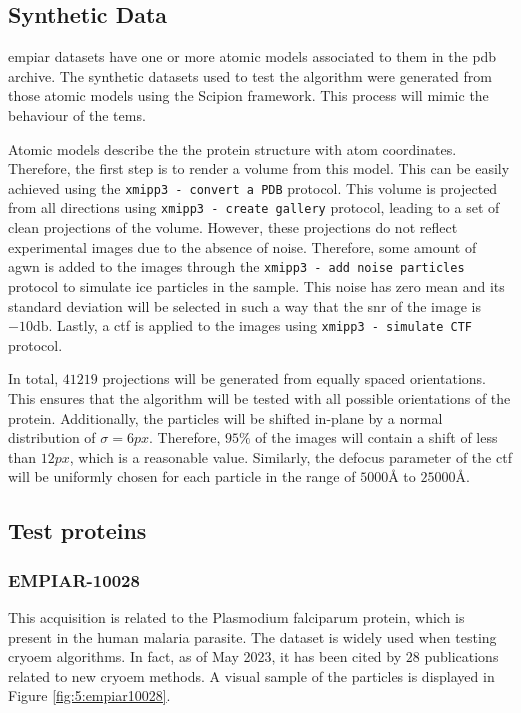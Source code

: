 \documentclass[../main.tex]{subfiles}
\begin{document}
\subsection{Synthetic Data}
\Gls{empiar} datasets have one or more atomic models associated to them in the \gls{pdb} archive. The synthetic datasets used to test the algorithm were generated from those atomic models using the Scipion framework\cite{delarosa2016}. This process will mimic the behaviour of the \glspl{tem}.

Atomic models describe the the protein structure with atom coordinates. Therefore, the first step is to render a volume from this model. This can be easily achieved using the \texttt{xmipp3 - convert a PDB} protocol. This volume is projected from all directions using \texttt{xmipp3 - create gallery} protocol, leading to a set of clean projections of the volume. However, these projections do not reflect experimental images due to the absence of noise. Therefore, some amount of \gls{agwn} is added to the images through the \texttt{xmipp3 - add noise particles} protocol to simulate ice particles in the sample. This noise has zero mean and its standard deviation will be selected in such a way that the \gls{snr} of the image is $-10 \si{\decibel}$. Lastly, a \gls{ctf} is applied to the images using \texttt{xmipp3 - simulate CTF} protocol. 

In total, $41219$ projections will be generated from equally spaced orientations. This ensures that the algorithm will be tested with all possible orientations of the protein. Additionally, the particles will be shifted in-plane by a normal distribution of $\sigma=6\si{px}$. Therefore, $95\si{\percent}$ of the images will contain a shift of less than $12 \si{px}$, which is a reasonable value. Similarly, the defocus parameter of the \gls{ctf} will be uniformly chosen for each particle in the range of $5000 \si{\angstrom}$ to $25000 \si{\angstrom}$.


\subsection{Test proteins}
\subsubsection{EMPIAR-10028}
This acquisition is related to the Plasmodium falciparum protein, which is present in the human malaria parasite\cite{wong2014}\cite{empiar10028}. The dataset is widely used when testing \gls{cryoem} algorithms. In fact, as of May 2023, it has been cited by $28$ publications related to new \gls{cryoem} methods. A visual sample of the particles is displayed in Figure \ref{fig:5:empiar10028}.
\end{document}
